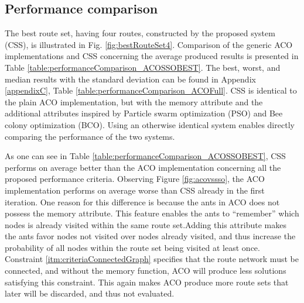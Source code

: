 \subsection{Performance comparison}
\label{subsec:performanceComparisonDiscussion}


The best route set, having four routes, constructed by the proposed system (CSS), is illustrated in Fig. \vref{fig:bestRouteSet4}. Comparison of the generic ACO implementations and CSS concerning the average produced results is presented in Table \vref{table:performanceComparison_ACOSSOBEST}. The best, worst, and median results with the standard deviation can be found in Appendix \ref{appendixC}, Table \vref{table:performanceComparison_ACOFull}. CSS is identical to the plain ACO implementation, but with the memory attribute and the additional attributes inspired by Particle swarm optimization (PSO) and Bee colony optimization (BCO). Using an otherwise identical system enables directly comparing the performance of the two systems. 

As one can see in Table \vref{table:performanceComparison_ACOSSOBEST}, CSS performs on average better than the ACO implementation concerning all the proposed performance criteria. Observing Figure \ref{fig:acovssso}, the ACO implementation performs on average worse than CSS already in the first iteration. One reason for this difference is because the ants in ACO does not possess the memory attribute. This feature enables the ants to ``remember'' which nodes is already visited within the same route set.Adding this attribute makes the ants favor nodes not visited over nodes already visited, and thus increase the probability of all nodes within the route set being visited at least once. Constraint \vref{itm:criteriaConnectedGraph} specifies that the route network must be connected, and without the memory function, ACO will produce less solutions satisfying this constraint. This again makes ACO produce more route sets that later will be discarded, and thus not evaluated. %

